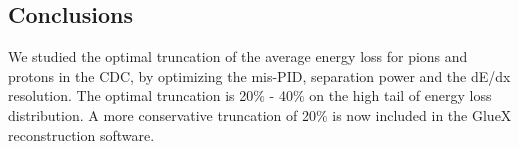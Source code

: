 \subsection{Conclusions}
We studied the optimal truncation of the average energy loss for pions and protons in the CDC, by optimizing the mis-PID, separation power and the dE/dx resolution. The optimal truncation is 20$\%$ - 40$\%$ on the high tail of energy loss distribution. A more conservative truncation of 20$\%$ is now included in the GlueX reconstruction software.


